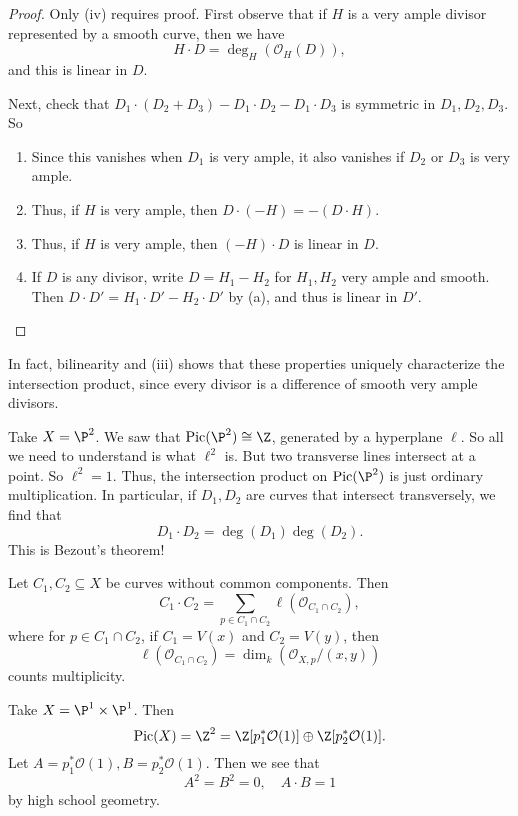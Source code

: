 \documentclass[a4paper]{article}
\newcommand\Pic{\mathrm{Pic}}
\begin{document}
\begin{proof}
  Only (iv) requires proof. First observe that if $H$ is a very ample divisor represented by a smooth curve, then we have
  \[
    H \cdot D = \deg_H(\mathcal{O}_H(D)),
  \]
  and this is linear in $D$.

  Next, check that $D_1 \cdot (D_2 + D_3) - D_1 \cdot D_2 - D_1 \cdot D_3$ is symmetric in $D_1, D_2, D_3$. So
  \begin{enumerate}[label=(\alph*)]
    \item Since this vanishes when $D_1$ is very ample, it also vanishes if $D_2$ or $D_3$ is very ample.
    \item Thus, if $H$ is very ample, then $D \cdot (-H) = - (D \cdot H)$.
    \item Thus, if $H$ is very ample, then $(-H) \cdot D$ is linear in $D$.
    \item If $D$ is any divisor, write $D = H_1 - H_2$ for $H_1, H_2$ very ample and smooth. Then $D \cdot D' = H_1 \cdot D' - H_2 \cdot D'$ by (a), and thus is linear in $D'$.\qedhere
  \end{enumerate}
\end{proof}

In fact, bilinearity and (iii) shows that these properties uniquely characterize the intersection product, since every divisor is a difference of smooth very ample divisors.

\begin{eg}
  Take $X = \P^2$. We saw that $\Pic(\P^2) \cong \Z$, generated by a hyperplane $\ell$. So all we need to understand is what $\ell^2$ is. But two transverse lines intersect at a point. So $\ell^2 = 1$. Thus, the intersection product on $\Pic(\P^2)$ is just ordinary multiplication. In particular, if $D_1, D_2$ are curves that intersect transversely, we find that
  \[
    D_1 \cdot D_2 = \deg(D_1) \deg(D_2).
  \]
  This is Bezout's theorem!
\end{eg}
\begin{ex}
  Let $C_1, C_2 \subseteq X$ be curves without common components. Then
  \[
    C_1 \cdot C_2 = \sum_{p \in C_1 \cap C_2} \ell(\mathcal{O}_{C_1 \cap C_2}),
  \]
  where for $p \in C_1 \cap C_2$, if $C_1 = V(x)$ and $C_2 = V(y)$, then
  \[
    \ell(\mathcal{O}_{C_1 \cap C_2}) = \dim_k(\mathcal{O}_{X, p}/(x, y))
  \]
  counts multiplicity.
\end{ex}

\begin{eg}
  Take $X = \P^1 \times \P^1$. Then
  \[
    \Pic(X) = \Z^2 = \Z[p_1^* \mathcal{O}(1)] \oplus \Z[p_2^* \mathcal{O}(1)].
  \]
  Let $A = p_1^* \mathcal{O}(1), B = p_2^* \mathcal{O}(1)$. Then we see that
  \[
    A^2 = B^2 = 0,\quad A \cdot B = 1
  \]
  by high school geometry.
\end{eg}
\end{document}
